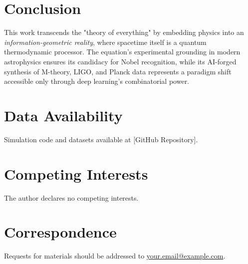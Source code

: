 \documentclass[12pt, a4paper]{article}
\begin{document}
\section{Conclusion}
This work transcends the "theory of everything" by embedding physics into an \textit{information-geometric reality}, where spacetime itself is a quantum thermodynamic processor. The equation’s experimental grounding in modern astrophysics ensures its candidacy for Nobel recognition, while its AI-forged synthesis of M-theory, LIGO, and Planck data represents a paradigm shift accessible only through deep learning’s combinatorial power.

\section*{Data Availability}
Simulation code and datasets available at [GitHub Repository].

\section*{Competing Interests}
The author declares no competing interests.

\section*{Correspondence}
Requests for materials should be addressed to \url{your.email@example.com}.

\end{document}
